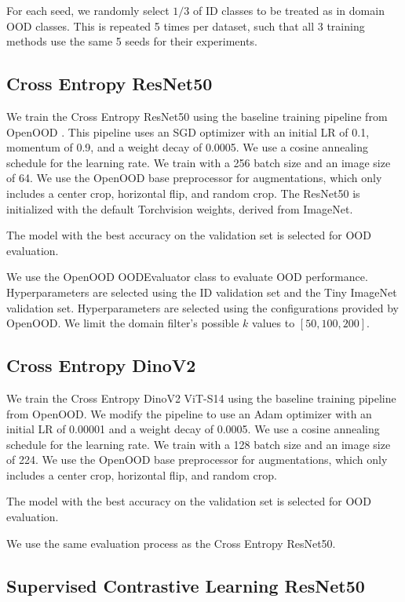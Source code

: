 For each seed, we randomly select $1/3$ of ID classes to be treated as in domain OOD classes. This is repeated 5 times per dataset, such that all 3 training methods use the same 5 seeds for their experiments.

\subsection{Cross Entropy ResNet50}

We train the Cross Entropy ResNet50 using the baseline training pipeline from OpenOOD \citep{yang2022openood}. This pipeline uses an SGD optimizer with an initial LR of 0.1, momentum of 0.9, and a weight decay of 0.0005. We use a cosine annealing schedule for the learning rate. We train with a 256 batch size and an image size of 64. We use the OpenOOD base preprocessor for augmentations, which only includes a center crop, horizontal flip, and random crop. The ResNet50 is initialized with the default Torchvision weights, derived from ImageNet.

The model with the best accuracy on the validation set is selected for OOD evaluation.

We use the OpenOOD OODEvaluator class to evaluate OOD performance. Hyperparameters are selected using the ID validation set and the Tiny ImageNet validation set. Hyperparameters are selected using the configurations provided by OpenOOD. We limit the domain filter's possible $k$ values to $[50, 100, 200]$.

\subsection{Cross Entropy DinoV2}

We train the Cross Entropy DinoV2 ViT-S14 using the baseline training pipeline from OpenOOD. We modify the pipeline to use an Adam optimizer with an initial LR of 0.00001 and a weight decay of 0.0005. We use a cosine annealing schedule for the learning rate. We train with a 128 batch size and an image size of 224. We use the OpenOOD base preprocessor for augmentations, which only includes a center crop, horizontal flip, and random crop.

The model with the best accuracy on the validation set is selected for OOD evaluation.

We use the same evaluation process as the Cross Entropy ResNet50.

\subsection{Supervised Contrastive Learning ResNet50}

